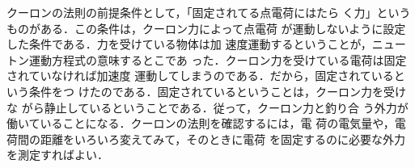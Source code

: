     クーロンの法則の前提条件として，「固定されてる点電荷にはたら
    く力」というものがある．この条件は，クーロン力によって点電荷
    が運動しないように設定した条件である．力を受けている物体は加
    速度運動するということが，ニュートン運動方程式の意味するとこであ
    った．クーロン力を受けている電荷は固定されていなければ加速度
    運動してしまうのである．だから，固定されているという条件をつ
    けたのである．固定されているということは，クーロン力を受けな
    がら静止しているということである．従って，クーロン力と釣り合
    う外力が働いていることになる．クーロンの法則を確認するには，電
    荷の電気量や，電荷間の距離をいろいろ変えてみて，そのときに電荷
    を固定するのに必要な外力を測定すればよい．

